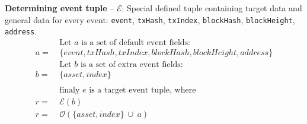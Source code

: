 \documentclass[12pt]{report}
\newcommand{\hlc}[1]{\colorbox{yellow!25}{#1}}
\def\code#1{\colorbox{light-gray}{\texttt{#1}}}
\begin{document}
\textbf{\hlc{Determining} event tuple } – $\mathcal{E}$:\hfill\null\linebreak
Special defined tuple containing target data and general data for every event: \code{event}, \code{txHash}, \code{txIndex}, \code{blockHash}, \code{blockHeight}, \code{address}.
\begin{align}
&\ \text{Let } a \text{ is a set of default event fields: } \nonumber\\
a =&\ \{event, txHash, txIndex, blockHash, blockHeight, address\} \nonumber\\
&\ \text{Let } b \text{ is a set of extra event fields: } \nonumber\\
b =&\ \{asset, index\} \nonumber\\
&\ \nonumber\\
&\ \text{finaly } e \text{ is a target event tuple, where} \nonumber\\
r =&\ \mathcal{E}(b) \\
r =&\ \mathcal{O}(\{asset, index\} \ \cup \ a)
\end{align}

\pagebreak
\end{document}
